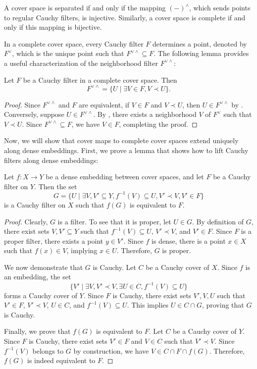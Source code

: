 \documentclass[reqno]{amsart}
\theoremstyle{definition}
\theoremstyle{remark}
\numberwithin{figure}{section}
\newcommand{\rb}{\prec}
\begin{document}
\begin{remark}
A cover space is separated if and only if the mapping $(-)^\wedge$, which sends points to regular Cauchy filters, is injective.
Similarly, a cover space is complete if and only if this mapping is bijective.
\end{remark}

In a complete cover space, every Cauchy filter $F$ determines a point, denoted by $F^\vee$, which is the unique point such that $F^{\vee \wedge} \subseteq F$.
The following lemma provides a useful characterization of the neighborhood filter $F^{\vee \wedge}$:

\begin{lem}
Let $F$ be a Cauchy filter in a complete cover space.
Then
\[ F^{\vee \wedge} = \{ U \mid \exists V \in F, V \rb U \}. \]
\end{lem}
\begin{proof}
Since $F^{\vee \wedge}$ and $F$ are equivalent, if $V \in F$ and $V \rb U$, then $U \in F^{\vee \wedge}$ by .
Conversely, suppose $U \in F^{\vee \wedge}$.
By , there exists a neighborhood $V$ of $F^\vee$ such that $V \rb U$.
Since $F^{\vee \wedge} \subseteq F$, we have $V \in F$, completing the proof.
\end{proof}

Now, we will show that cover maps to complete cover spaces extend uniquely along dense embeddings.
First, we prove a lemma that shows how to lift Cauchy filters along dense embeddings:

\begin{lem}
Let $f : X \to Y$ be a dense embedding between cover spaces, and let $F$ be a Cauchy filter on $Y$.
Then the set
\[ G = \{ U \mid \exists V,V' \subseteq Y, f^{-1}(V) \subseteq U, V' \rb V, V' \in F \} \]
is a Cauchy filter on $X$ such that $f(G)$ is equivalent to $F$.
\end{lem}
\begin{proof}
Clearly, $G$ is a filter.
To see that it is proper, let $U \in G$.
By definition of $G$, there exist sets $V, V' \subseteq Y$ such that $f^{-1}(V) \subseteq U$, $V' \rb V$, and $V' \in F$.
Since $F$ is a proper filter, there exists a point $y \in V'$.
Since $f$ is dense, there is a point $x \in X$ such that $f(x) \in V$, implying $x \in U$.
Therefore, $G$ is proper.

We now demonstrate that $G$ is Cauchy.
Let $C$ be a Cauchy cover of $X$.
Since $f$ is an embedding, the set
\[ \{ V' \mid \exists V, V' \rb V, \exists U \in C, f^{-1}(V) \subseteq U \} \]
forms a Cauchy cover of $Y$.
Since $F$ is Cauchy, there exist sets $V',V,U$ such that $V' \in F$, $V' \rb V$, $U \in C$, and $f^{-1}(V) \subseteq U$.
This implies $U \in C \cap G$, proving that $G$ is Cauchy.

Finally, we prove that $f(G)$ is equivalent to $F$.
Let $C$ be a Cauchy cover of $Y$.
Since $F$ is Cauchy, there exist sets $V' \in F$ and $V \in C$ such that $V' \rb V$.
Since $f^{-1}(V)$ belongs to $G$ by construction, we have $V \in C \cap F \cap f(G)$.
Therefore, $f(G)$ is indeed equivalent to $F$.
\end{proof}
\end{document}
